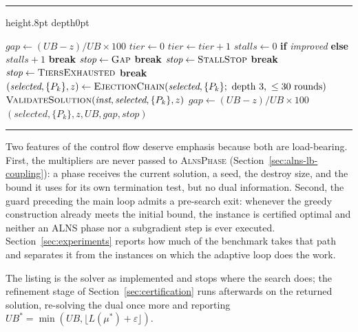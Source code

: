 \documentclass[preprint,12pt]{elsarticle}
\makeatletter
\newenvironment{breakablealgorithm}
  {\begin{center}%
     \refstepcounter{algorithm}%
     \hrule height.8pt depth0pt \kern2pt%
     \renewcommand{\caption}[2][\relax]{%
       {\raggedright\textbf{\ALG@name~\thealgorithm}\ ##2\par}%
       \ifx\relax##1\relax
         \addcontentsline{loa}{algorithm}{\protect\numberline{\thealgorithm}##2}%
       \else
         \addcontentsline{loa}{algorithm}{\protect\numberline{\thealgorithm}##1}%
       \fi
       \kern2pt\hrule\kern2pt%
     }%
  }{\kern2pt\hrule\relax\end{center}}
\makeatother
\begin{document}
\begin{breakablealgorithm}
\begin{algorithmic}[1]
    \EndIf
    \State $\textit{gap} \gets (UB - z)/UB \times 100$
            \State $\textit{tier} \gets 0$
            \State $\textit{tier} \gets \textit{tier} + 1$
        \EndIf
    \EndIf
    \State $\textit{stalls} \gets 0$ \textbf{if} \textit{improved} \textbf{else} $\textit{stalls}+1$
        \State \textbf{break}
    \EndIf
        \State $\textit{stop} \gets \textsc{Gap}$
        \State \textbf{break}
    \EndIf
        \State $\textit{stop} \gets \textsc{StallStop}$ 
        \State \textbf{break}
    \EndIf
        \State $\textit{stop} \gets \textsc{TiersExhausted}$
        \State \textbf{break}
    \EndIf
\EndWhile
\EndIf
\State $(\textit{selected}, \{P_k\}, z) \gets \textsc{EjectionChain}(\textit{selected}, \{P_k\};\ \text{depth } 3,\ \le 30 \text{ rounds})$
\State $\textsc{ValidateSolution}(\textit{inst}, \textit{selected}, \{P_k\}, z)$
\State $\textit{gap} \gets (UB - z)/UB \times 100$
\State \Return $(\textit{selected}, \{P_k\}, z, UB, \textit{gap}, \textit{stop})$
\end{algorithmic}
\end{breakablealgorithm}

Two features of the control flow deserve emphasis because both are load-bearing. First, the multipliers are never passed to \textsc{AlnsPhase} (Section~\ref{sec:alns-lb-coupling}): a phase receives the current solution, a seed, the destroy size, and the bound it uses for its own termination test, but no dual information. Second, the guard preceding the main loop admits a pre-search exit: whenever the greedy construction already meets the initial bound, the instance is certified optimal and neither an ALNS phase nor a subgradient step is ever executed. Section~\ref{sec:experiments} reports how much of the benchmark takes that path and separates it from the instances on which the adaptive loop does the work.

The listing is the solver as implemented and stops where the search does; the refinement stage of Section~\ref{sec:certification} runs afterwards on the returned solution, re-solving the dual once more and reporting $UB^* = \min(UB, \lfloor L(\mu^*)+\varepsilon\rfloor)$.
\end{document}
